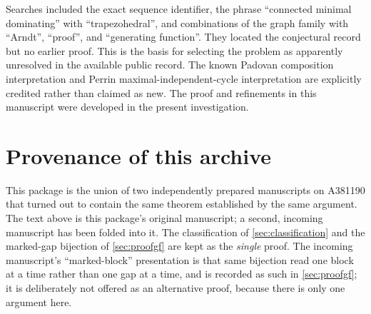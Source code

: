 \documentclass[11pt,letterpaper]{article}
\numberwithin{equation}{section}
\theoremstyle{definition}
\newcommand{\1}{\mathbf 1}
\begin{document}
Searches included the exact sequence identifier, the phrase ``connected minimal
dominating'' with ``trapezohedral'', and combinations of the graph family with
``Arndt'', ``proof'', and ``generating function''. They located the conjectural
record but no earlier proof. This is the basis for selecting the problem as
apparently unresolved in the available public record. The known Padovan
composition interpretation and Perrin maximal-independent-cycle interpretation
are explicitly credited rather than claimed as new. The proof and refinements
in this manuscript were developed in the present investigation.

\section{Provenance of this archive}\label{sec:provenance}
This package is the union of two independently prepared manuscripts on
A381190 that turned out to contain the same theorem established by the same
argument. The text above is this package's original manuscript; a second,
incoming manuscript has been folded into it. The classification of
\cref{sec:classification} and the marked-gap bijection of \cref{sec:proofgf}
are kept as the \emph{single} proof. The incoming manuscript's
``marked-block'' presentation is that same bijection read one block at a time
rather than one gap at a time, and is recorded as such in \cref{sec:proofgf};
it is deliberately not offered as an alternative proof, because there is only
one argument here.
\end{document}
